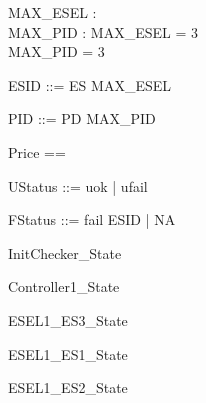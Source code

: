 \documentclass{article}
\begin{document}

\begin{axdef}
	MAX\_ESEL : \nat \\
 MAX\_PID : \nat 
\where
 MAX\_ESEL = 3 \\
 MAX\_PID = 3
\end{axdef}

\begin{zed}
	ESID ::= ES  \upto MAX\_ESEL \rdata
\end{zed}

\begin{zed}
	PID ::= PD  \upto MAX\_PID \rdata
\end{zed}

\begin{zed}
	Price == \nat
\end{zed}

\begin{zed}
	UStatus ::= uok | ufail
\end{zed}

\begin{zed}
	FStatus ::= fail \ldata ESID \rdata | NA
\end{zed}

\begin{zed}
	InitChecker\_State 
\end{zed}

\begin{zed}
	Controller1\_State 
\end{zed}

\begin{zed}
	ESEL1\_ES3\_State 
\end{zed}

\begin{zed}
	ESEL1\_ES1\_State 
\end{zed}

\begin{zed}
	ESEL1\_ES2\_State 
\end{zed}
\end{document}
